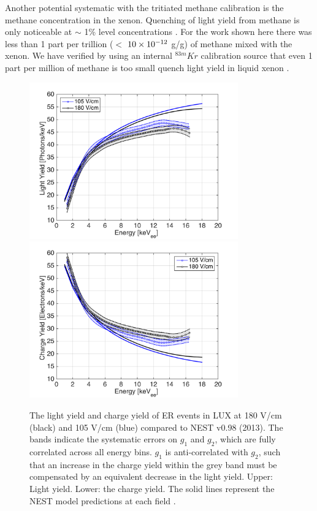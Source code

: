 Another potential systematic with the tritiated methane calibration is the methane concentration in the xenon. Quenching of light yield from methane is only noticeable at $\sim$ 1\% level concentrations \cite{Kirill_Methane}. For the work shown here there was less than 1 part per trillion ($<$ $\rm10\times10^{-12}$ g/g) of methane mixed with the xenon. We have verified by using an internal $^{83m}Kr$ calibration source that even 1 part per million of methane is too small quench light yield in liquid xenon \cite{Dobi_Thesis}.


\begin{figure}[h!]\centering
\includegraphics[width=90mm]{fig/ER_LY.png}
\includegraphics[width=90mm]{fig/ER_QY.png}
\caption{The light yield and charge yield of ER events in LUX at 180 V/cm (black) and 105 V/cm (blue) compared to NEST v0.98 (2013). The bands indicate the systematic errors on $g_1$ and $g_2$, which are fully correlated across all energy bins. $g_1$ is anti-correlated with $g_2$, such that an increase in the charge yield within the grey band must be compensated by an equivalent decrease in the light yield. Upper: Light yield. Lower: the charge yield. The solid lines represent the NEST model predictions at each field \cite{NEST_2013}.}
\label{fig:ER-LY-QY}
\end{figure}


